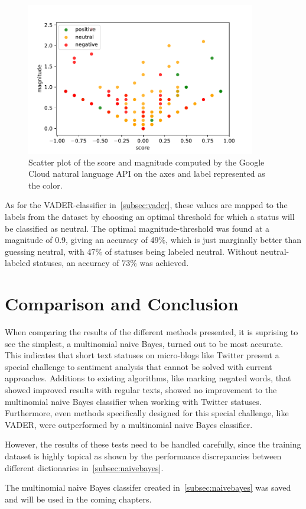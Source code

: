 \begin{figure}
    \centering
    \caption{Scatter plot of the score and magnitude computed by the Google Cloud natural language API on the axes and label represented as the color.}
    \label{fig:gcloud}
    \includegraphics[width=10cm]{../figures/gcloud.pdf}
\end{figure}

As for the VADER-classifier in~\ref{subsec:vader}, these values are mapped to the labels from the dataset by
choosing an optimal threshold for which a status will be classified as neutral.
The optimal magnitude-threshold was found at a magnitude of 0.9, giving an accuracy of 49\%,
which is just marginally better than guessing neutral, with 47\% of statuses being labeled neutral.
Without neutral-labeled statuses, an accuracy of 73\% was achieved.

\section{Comparison and Conclusion}
\label{sec:comparison}

When comparing the results of the different methods presented, it is suprising to see the simplest,
a multinomial naive Bayes, turned out to be most accurate.\\
This indicates that short text statuses on micro-blogs like Twitter present a special challenge to sentiment analysis
that cannot be solved with current approaches.
Additions to existing algorithms, like marking negated words, that showed improved results with regular texts,
showed no improvement to the multinomial naive Bayes classifier when working with Twitter statuses.
Furthermore, even methods specifically designed for this special challenge, like VADER,
were outperformed by a multinomial naive Bayes classifier.
\par
However, the results of these tests need to be handled carefully,
since the training dataset is highly topical as shown by the performance discrepancies between different dictionaries in~\ref{subsec:naivebayes}.
\par
The multinomial naive Bayes classifer created in~\ref{subsec:naivebayes} was saved and will be used in the coming chapters.
